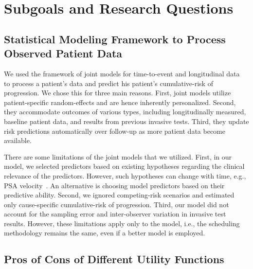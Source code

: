 \section{Subgoals and Research Questions}
\label{c7:sec:subgoals}
\subsection{Statistical Modeling Framework to Process Observed Patient Data}
We used the framework of joint models for time-to-event and longitudinal data~\citep{rizopoulos2012joint,tsiatis2004joint} to process a patient's data and predict his patient's cumulative-risk of progression. We chose this for three main reasons. First, joint models utilize patient-specific random-effects and are hence inherently personalized. Second, they accommodate outcomes of various types, including longitudinally measured, baseline patient data, and results from previous invasive tests. Third, they update risk predictions automatically over follow-up as more patient data become available. 

There are some limitations of the joint models that we utilized. First, in our model, we selected predictors based on existing hypotheses regarding the clinical relevance of the predictors. However, such hypotheses can change with time, e.g., PSA velocity~\citep{vickers2014commentary}. An alternative is choosing model predictors based on their predictive ability. Second, we ignored competing-risk scenarios and estimated only cause-specific cumulative-risk of progression. Third, our model did not account for the sampling error and inter-observer variation in invasive test results. However, these limitations apply only to the model, i.e., the scheduling methodology remains the same, even if a better model is employed.

\subsection{Pros of Cons of Different Utility Functions}

